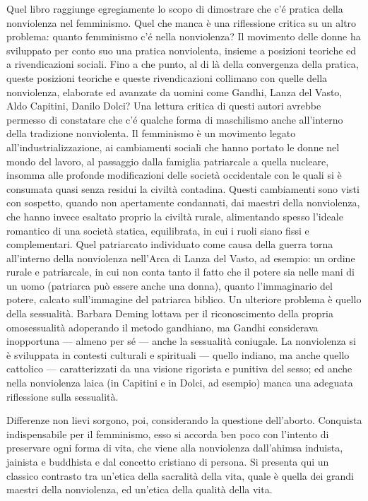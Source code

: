 \documentclass[12pt,oneside,openany]{book}
\begin{document}
Quel libro raggiunge egregiamente lo scopo di dimostrare che c'é pratica della nonviolenza nel femminismo. Quel che manca è una riflessione critica su un altro problema: quanto femminismo c'é nella nonviolenza? Il movimento delle donne ha sviluppato per conto suo una pratica nonviolenta, insieme a posizioni teoriche ed a rivendicazioni sociali. Fino a che punto, al di là della convergenza della pratica, queste posizioni teoriche e queste rivendicazioni collimano con quelle della nonviolenza, elaborate ed avanzate da uomini come Gandhi, Lanza del Vasto, Aldo Capitini, Danilo Dolci? Una lettura critica di questi autori avrebbe permesso di constatare che c'é qualche forma di maschilismo anche all'interno della tradizione nonviolenta. Il femminismo è un movimento legato all'industrializzazione, ai cambiamenti sociali che hanno portato le donne nel mondo del lavoro, al passaggio dalla famiglia patriarcale a quella nucleare, insomma alle profonde modificazioni delle società occidentale con le quali si è consumata quasi senza residui la civiltà contadina. Questi cambiamenti sono visti con sospetto, quando non apertamente condannati, dai maestri della nonviolenza, che hanno invece esaltato proprio la civiltà rurale, alimentando spesso l'ideale romantico di una società statica, equilibrata, in cui i ruoli siano fissi e complementari. Quel patriarcato individuato come causa della guerra torna all'interno della nonviolenza nell'Arca di Lanza del Vasto, ad esempio: un ordine rurale e patriarcale, in cui non conta tanto il fatto che il potere sia nelle mani di un uomo (patriarca può essere anche una donna), quanto l'immaginario del potere, calcato sull'immagine del patriarca biblico. Un ulteriore problema è quello della sessualità. Barbara Deming lottava per il riconoscimento della propria omosessualità adoperando il metodo gandhiano, ma Gandhi considerava inopportuna --- almeno per sé --- anche la sessualità coniugale. La nonviolenza si è sviluppata in contesti culturali e spirituali --- quello indiano, ma anche quello cattolico --- caratterizzati da una visione rigorista e punitiva del sesso; ed anche nella nonviolenza laica (in Capitini e in Dolci, ad esempio) manca una adeguata riflessione sulla sessualità.



Differenze non lievi sorgono, poi, considerando la questione dell'aborto. Conquista indispensabile per il femminismo, esso si accorda ben poco con l'intento di preservare ogni forma di vita, che viene alla nonviolenza dall'ahimsa induista, jainista e buddhista e dal concetto cristiano di persona. Si presenta qui un classico contrasto tra un'etica della sacralità della vita, quale è quella dei grandi maestri della nonviolenza, ed un'etica della qualità della vita.
\end{document}
